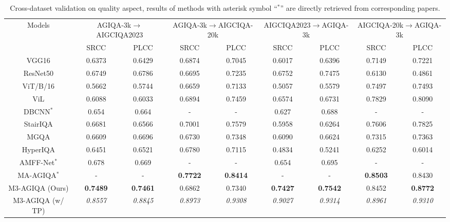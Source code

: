 
\begin{table*}
    \centering
    \caption{Cross-dataset validation on quality aspect, results of methods with asterisk symbol ``$^\ast$'' are directly retrieved from corresponding papers.}
    \label{tab:crossdataset1}
    \begin{tabular}{c|cc|cc|cc|cc}
        \toprule
        \multirow{2}{*}{Models} & \multicolumn{2}{c|}{AGIQA-3k$\rightarrow$AIGCIQA2023} & \multicolumn{2}{c|}{AGIQA-3k$\rightarrow$AIGCIQA-20k} & \multicolumn{2}{c|}{AIGCIQA2023$\rightarrow$AGIQA-3k} & \multicolumn{2}{c}{AIGCIQA-20k$\rightarrow$AGIQA-3k}  \\
        \cline{2-9}
    & SRCC & PLCC & SRCC & PLCC & SRCC & PLCC & SRCC & PLCC \\
        \midrule
        VGG16 & 0.6373 & 0.6429 & 0.6874 & 0.7045 & 0.6017 & 0.6396 & 0.7149 & 0.7221 \\ 
        ResNet50 & 0.6749 & 0.6786 & 0.6695 & 0.7235 & 0.6752 & 0.7475 & 0.6130 & 0.4861 \\
        ViT/B/16 & 0.5662 & 0.5744 & 0.6659 & 0.7133 & 0.5057 & 0.5579 & 0.7497 & 0.7493 \\
        ViL & 0.6088 & 0.6033 & 0.6894 & 0.7459 & 0.6574 & 0.6731 & 0.7829 & 0.8090 \\
        \midrule
        DBCNN$^\ast$ & 0.654 & 0.664 & - & - & 0.627 & 0.688 & - & - \\
        StairIQA & 0.6681 & 0.6566 & 0.7001 & 0.7579 & 0.5958 & 0.6264 & 0.7606 & 0.7825 \\
        MGQA & 0.6609 & 0.6696 & 0.6730 & 0.7348 & 0.6090 & 0.6624 & 0.7315 & 0.7363 \\
        HyperIQA & 0.6451 & 0.6521 & 0.6780 & 0.7115 & 0.4834 & 0.5241 & 0.6252 & 0.6014 \\
        \midrule
        AMFF-Net$^\ast$ & 0.678 & 0.669 & - & - & 0.654 & 0.695 & - & - \\
        MA-AGIQA$^\ast$ & - & - & \textbf{0.7722} & \textbf{0.8414} & - & - & \textbf{0.8503} & 0.8430 \\
        \midrule
        M3-AGIQA (Ours) & \textbf{0.7489} & \textbf{0.7461} & 0.6862 & 0.7340 & \textbf{0.7427} & \textbf{0.7542} & 0.8452 & \textbf{0.8772} \\
        M3-AGIQA (w/ TP) & \textit{0.8557} & \textit{0.8845} & \textit{0.8973} & \textit{0.9308} & \textit{0.9027} & \textit{0.9314} & \textit{0.8961} & \textit{0.9310} \\
        \midrule
        \bottomrule
    \end{tabular}
\end{table*}

